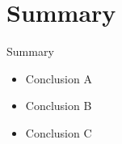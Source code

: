 \documentclass{beamer}
\begin{document}









\section*{Summary}

\begin{frame}{Summary}

  \begin{itemize}
  \item
    Conclusion A
  \item
    Conclusion B
  \item
    Conclusion C
  \end{itemize}

\end{frame}
\end{document}

